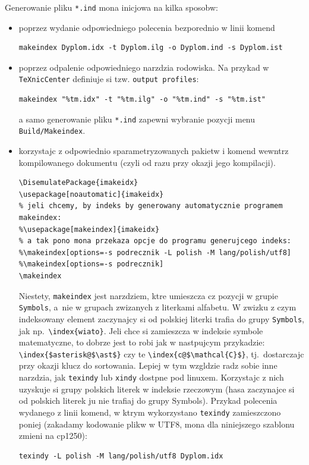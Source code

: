 Generowanie pliku \texttt{*.ind} mona inicjowa na kilka sposobw:
\begin{itemize}
\item poprzez wydanie odpowiedniego polecenia bezporednio w linii komend 
\begin{lstlisting}[basicstyle=\footnotesize\ttfamily]
makeindex Dyplom.idx -t Dyplom.ilg -o Dyplom.ind -s Dyplom.ist
\end{lstlisting}
\item poprzez odpalenie odpowiedniego narzdzia rodowiska. Na przykad w \texttt{TeXnicCenter} definiuje si tzw. \texttt{output profiles}: 
\begin{lstlisting}[basicstyle=\footnotesize\ttfamily]
makeindex "%tm.idx" -t "%tm.ilg" -o "%tm.ind" -s "%tm.ist"
\end{lstlisting}
a samo generowanie pliku \texttt{*.ind} zapewni wybranie pozycji menu \texttt{Build/Makeindex}.
\item korzystajc z odpowiednio sparametryzowanych pakietw i komend wewntrz kompilowanego dokumentu (czyli od razu przy okazji jego kompilacji).
\begin{lstlisting}[basicstyle=\footnotesize\ttfamily]
\DisemulatePackage{imakeidx}
\usepackage[noautomatic]{imakeidx} 
% jeli chcemy, by indeks by generowany automatycznie programem makeindex:
%\usepackage[makeindex]{imakeidx} 
% a tak pono mona przekaza opcje do programu generujcego indeks:
%\makeindex[options=-s podrecznik -L polish -M lang/polish/utf8] 
%\makeindex[options=-s podrecznik]
\makeindex
\end{lstlisting}

Niestety, \texttt{makeindex} jest narzdziem, ktre umieszcza cz pozycji w grupie \texttt{Symbols}, a~nie w grupach zwizanych z literkami alfabetu. W zwizku z czym indeksowany element zaczynajcy si od polskiej literki trafia do grupy \texttt{Symbols}, jak np.~\verb?\index{wiato}?. Jeli chce si zamieszcza w indeksie symbole matematyczne, to dobrze jest to robi jak w nastpujcym przykadzie: \verb?\index{$asterisk@$\ast$}?  czy te \verb?\index{c@$\mathcal{C}$}?, tj.~dostarczajc przy okazji klucz do sortowania.
Lepiej w tym wzgldzie radz sobie inne narzdzia, jak \texttt{texindy} lub \texttt{xindy} dostpne pod linuxem. Korzystajc z nich uzyskuje si grupy polskich literek w indeksie rzeczowym (hasa zaczynajce si od polskich literek ju nie trafiaj do grupy Symbols). Przykad polecenia wydanego z linii komend, w ktrym wykorzystano \texttt{texindy} zamieszczono poniej (zakadamy kodowanie plikw w UTF8, mona dla niniejszego szablonu zmieni na cp1250):
\begin{lstlisting}[basicstyle=\footnotesize\ttfamily]
texindy -L polish -M lang/polish/utf8 Dyplom.idx
\end{lstlisting}


\end{itemize}

